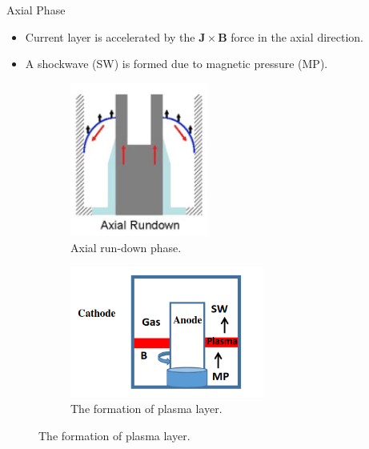 \begin{frame} {Axial Phase}
    \begin{itemize}
        \item Current layer is accelerated by the $\mathbf{J\times B}$ force in the axial direction.
        \item A shockwave (SW) is formed due to magnetic pressure (MP).
    \end{itemize}
    \begin{figure}
        \centering
        \begin{subfigure}{0.5\textwidth}
            \centering
            \includegraphics[width=0.5\textwidth]{figures/axial-rundown.png}
            \caption{Axial run-down phase. \cite{krishnan_2012_dense}}
        \end{subfigure}%
        \begin{subfigure}{0.5\textwidth}
            \centering
            \includegraphics[width=0.7\textwidth]{figures/axial-phase.png}
            \caption{The formation of plasma layer. \cite{behbahani_2017_enhancement}}
        \end{subfigure}
        \label{fig:axial-phase}
    \end{figure}
\end{frame}

